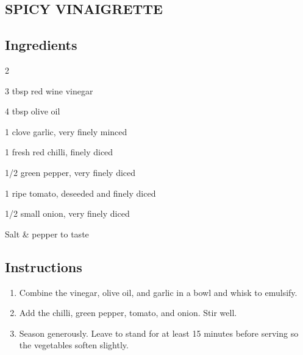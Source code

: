 \begin{minipage}{0.98\textwidth}
\subsection*{SPICY VINAIGRETTE}
\subsection*{Ingredients}
\begin{multicols}{2}
\begin{ingredients}
    \item 3 tbsp red wine vinegar
    \item 4 tbsp olive oil
    \item 1 clove garlic, very finely minced
    \item 1 fresh red chilli, finely diced
    \item 1/2 green pepper, very finely diced
    \item 1 ripe tomato, deseeded and finely diced
    \item 1/2 small onion, very finely diced
    \item Salt \& pepper to taste
\end{ingredients}
\end{multicols}
\subsection*{Instructions}
\begin{enumerate}
    \item Combine the vinegar, olive oil, and garlic in a bowl and whisk to emulsify.
    \item Add the chilli, green pepper, tomato, and onion. Stir well.
    \item Season generously. Leave to stand for at least 15 minutes before serving so the vegetables soften slightly.
\end{enumerate}

\end{minipage}
\vspace{4em}